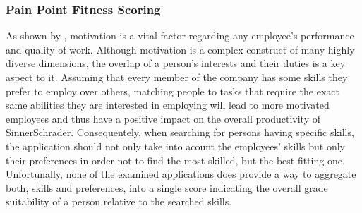 \subsubsection{Pain Point Fitness Scoring}
As shown by \cite{CanosDaros2013}, motivation is a vital factor regarding any employee's performance and quality of work.
Although motivation is a complex construct of many highly diverse dimensions, the overlap of a person's interests and their duties is a key aspect to it.
Assuming that every member of the company has some skills they prefer to employ over others, matching people to tasks that require the exact same abilities they are interested in employing will lead to more motivated employees and thus have a positive impact on the overall productivity of SinnerSchrader.
Consequentely, when searching for persons having specific skills, the application should not only take into acount the employees' skills but only their preferences in order not to find the most skilled, but the best fitting one. Unfortunally, none of the examined applications does provide a way to aggregate both, skills and preferences, into a
single score indicating the overall grade suitability of a person relative to the searched skills.
